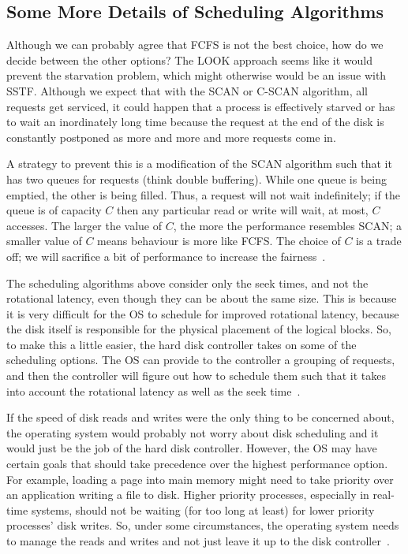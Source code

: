 \subsection*{Some More Details of Scheduling Algorithms}

Although we can probably agree that FCFS is not the best choice, how do we decide between the other options? The LOOK approach seems like it would prevent the starvation problem, which might otherwise would be an issue with SSTF. Although we expect that with the SCAN or C-SCAN algorithm, all requests get serviced, it could happen that a process is effectively starved or has to wait an inordinately long time because the request at the end of the disk is constantly postponed as more and more and more requests come in. 

A strategy to prevent this is a modification of the SCAN algorithm such that it has two queues for requests (think double buffering). While one queue is being emptied, the other is being filled. Thus, a request will not wait indefinitely; if the queue is of capacity $C$ then any particular read or write will wait, at most, $C$ accesses. The larger the value of $C$, the more the performance resembles SCAN; a smaller value of $C$ means behaviour is more like FCFS. The choice of $C$ is a trade off; we will sacrifice a bit of performance to increase the fairness~\cite{osi}.

The scheduling algorithms above consider only the seek times, and not the rotational latency, even though they can be about the same size. This is because it is very difficult for the OS to schedule for improved rotational latency, because the disk itself is responsible for the physical placement of the logical blocks. So, to make this a little easier, the hard disk controller takes on some of the scheduling options. The OS can provide to the controller a grouping of requests, and then the controller will figure out how to schedule them such that it takes into account the rotational latency as well as the seek time~\cite{osc}.

If the speed of disk reads and writes were the only thing to be concerned about, the operating system would probably not worry about disk scheduling and it would just be the job of the hard disk controller. However, the OS may have certain goals that should take precedence over the highest performance option. For example, loading a page into main memory might need to take priority over an application writing a file to disk. Higher priority processes, especially in real-time systems, should not be waiting (for too long at least) for lower priority processes' disk writes. So, under some circumstances, the operating system needs to manage the reads and writes and not just leave it up to the disk controller~\cite{osc}.




